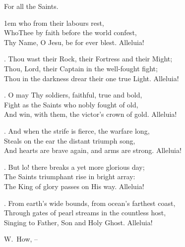 
\beginhymn For all the Saints.

{\leftskip1em
 who from their labours rest,\\}
Who\beginlyrics Thee by faith before the world confest,\\
Thy Name, O Jesu, be for ever blest. Alleluia!

. Thou wast their Rock, their Fortress and their Might;\\
Thou, Lord, their Captain in the well-fought fight;\\
Thou in the darkness drear their one true Light. Alleluia!

. O may Thy soldiers, faithful, true and bold,\\
Fight as the Saints who nobly fought of old,\\
And win, with them, the victor's crown of gold. Alleluia!

. And when the strife is fierce, the warfare long,\\
Steals on the ear the distant triumph song,\\
And hearts are brave again, and arms are strong.  Alleluia!

. But lo!  there breaks a yet more glorious day;\\
The Saints triumphant rise in bright array:\\
The King of glory passes on His way.  Alleluia!

. From earth's wide bounds, from ocean's farthest coast,\\
Through gates of pearl streams in the countless host,\\
Singing to Father, Son and Holy Ghost.  Alleluia!

\endlyrics

\medskip

\source W.~How, {}--{}



